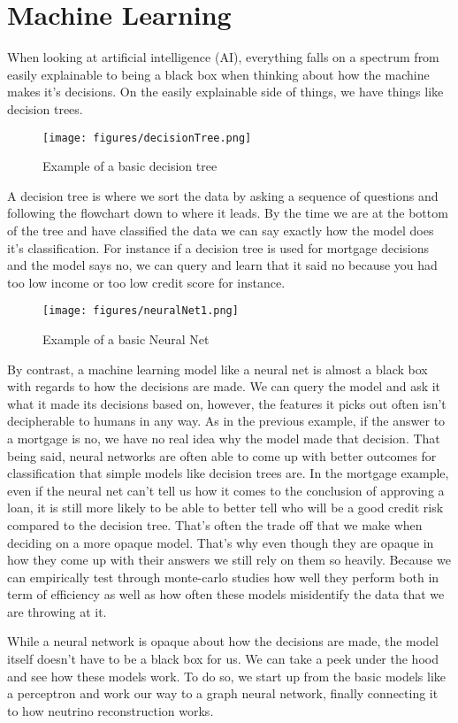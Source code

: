 \section{Machine Learning}

When looking at artificial intelligence (AI), everything falls on a spectrum from easily explainable to being a black box when thinking about how the machine makes it's decisions.
On the easily explainable side of things, we have things like decision trees.

\begin{figure}[H]
  \centering
  \texttt{[image: figures/decisionTree.png]}
  \caption{Example of a basic decision tree}
  \label{decisionTree}
\end{figure}

A decision tree is where we sort the data by asking a sequence of questions and following the flowchart down to where it leads.
By the time we are at the bottom of the tree and have classified the data we can say exactly how the model does it's classification.
For instance if a decision tree is used for mortgage decisions and the model says no, we can query and learn that it said no because you had too low income or too low credit score for instance.

\begin{figure}[H]
  \centering
  \texttt{[image: figures/neuralNet1.png]}
  \caption{Example of a basic Neural Net}
  \label{neuralNet1}
\end{figure}

By contrast, a machine learning model like a neural net is almost a black box with regards to how the decisions are made.
We can query the model and ask it what it made its decisions based on, however, the features it picks out often isn't decipherable to humans in any way.
As in the previous example, if the answer to a mortgage is no, we have no real idea why the model made that decision.
That being said, neural networks are often able to come up with better outcomes for classification that simple models like decision trees are.
In the mortgage example, even if the neural net can't tell us how it comes to the conclusion of approving a loan, it is still more likely to be able to better tell who will be a good credit risk compared to the decision tree.
That's often the trade off that we make when deciding on a more opaque model.
That's why even though they are opaque in how they come up with their answers we still rely on them so heavily.
Because we can empirically test through monte-carlo studies how well they perform both in term of efficiency as well as how often these models misidentify the data that we are throwing at it.

While a neural network is opaque about how the decisions are made, the model itself doesn't have to be a black box for us.
We can take a peek under the hood and see how these models work.
To do so, we start up from the basic models like a perceptron and work our way to a graph neural network, finally connecting it to how neutrino reconstruction works.








 